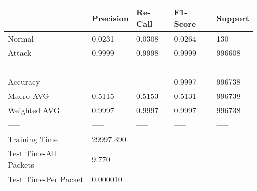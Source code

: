 \begin{tabular}{lllll}
\toprule
{} &  Precision & Re-Call & F1-Score & Support \\
\midrule
Normal                &     0.0231 &  0.0308 &   0.0264 &     130 \\
Attack                &     0.9999 &  0.9998 &   0.9999 &  996608 \\
-----                 &      ----- &   ----- &    ----- &   ----- \\
Accuracy              &            &         &   0.9997 &  996738 \\
Macro AVG             &     0.5115 &  0.5153 &   0.5131 &  996738 \\
Weighted AVG          &     0.9997 &  0.9997 &   0.9997 &  996738 \\
-----                 &      ----- &   ----- &    ----- &   ----- \\
Training Time         &  29997.390 &   ----- &    ----- &   ----- \\
Test Time-All Packets &      9.770 &   ----- &    ----- &   ----- \\
Test Time-Per Packet  &   0.000010 &   ----- &    ----- &   ----- \\
\bottomrule
\end{tabular}
